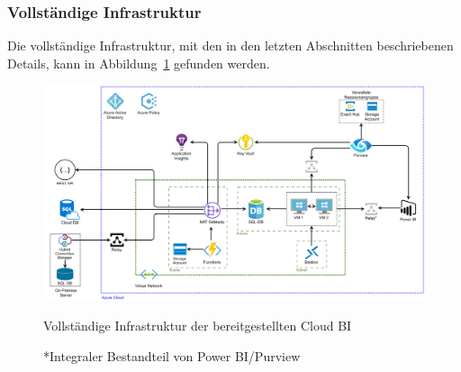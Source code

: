 \subsubsection{Vollständige Infrastruktur} \label{subsec:infra:konfig:VollständigeInfrastruktur}
Die vollständige Infrastruktur, mit den in den letzten Abschnitten beschriebenen Details, kann in Abbildung~\ref{fig:chap04_VollständigeInfrastruktur} gefunden werden.

 \begin{figure}[htbp]
 \centering
 \includegraphics[width=\textwidth]{gfx/cloudbiinfra.png}
 \caption[Vollständige Infrastruktur der Cloud BI]{Vollständige Infrastruktur der bereitgestellten Cloud BI}
 \caption*{\scriptsize{*Integraler Bestandteil von Power BI/Purview}}
\label{fig:chap04_VollständigeInfrastruktur}
\end{figure}